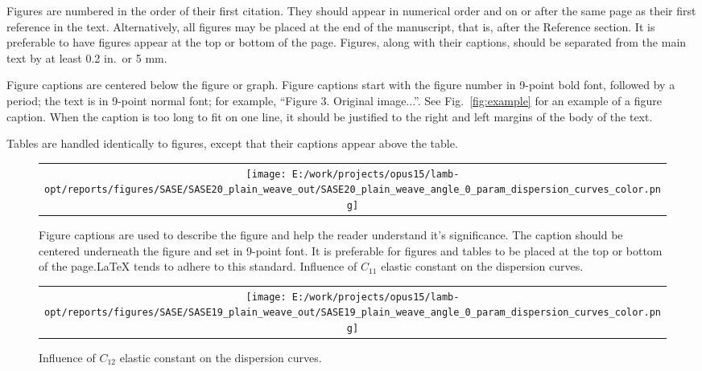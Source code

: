 \documentclass[]{spie}  %
\providecommand{\DIFaddtex}[1]{{\protect\color{red}#1}} %
\providecommand{\DIFdeltex}[1]{{\protect\color{mygrey}\scriptsize{#1}}}                       %
\providecommand{\DIFaddbegin}{} %
\providecommand{\DIFaddFL}[1]{\DIFadd{#1}} %
\providecommand{\DIFdelFL}[1]{\DIFdel{#1}} %
\providecommand{\DIFaddbeginFL}{} %
\providecommand{\DIFaddendFL}{} %
\providecommand{\DIFdelbeginFL}{} %
\providecommand{\DIFdelendFL}{} %
\providecommand{\DIFadd}[1]{\texorpdfstring{\DIFaddtex{#1}}{#1}} %
\providecommand{\DIFdel}[1]{\texorpdfstring{\DIFdeltex{#1}}{}} %
\newcommand{\DIFscaledelfig}{0.5}
\newlength{\DIFdelgraphicswidth} %
\newlength{\DIFdelgraphicsheight} %
\newcommand{\DIFaddincludegraphics}[2][]{{\color{blue}\fbox{\DIFOincludegraphics[#1]{#2}}}} %
\newcommand{\DIFdelincludegraphics}[2][]{%
\sbox{\DIFdelgraphicsbox}{\DIFOincludegraphics[#1]{#2}}%
\settoboxwidth{\DIFdelgraphicswidth}{\DIFdelgraphicsbox} %
\settoboxtotalheight{\DIFdelgraphicsheight}{\DIFdelgraphicsbox} %
\scalebox{\DIFscaledelfig}{%
\parbox[b]{\DIFdelgraphicswidth}{\usebox{\DIFdelgraphicsbox}\\[-\baselineskip] \rule{\DIFdelgraphicswidth}{0em}}\llap{\resizebox{\DIFdelgraphicswidth}{\DIFdelgraphicsheight}{%
\setlength{\unitlength}{\DIFdelgraphicswidth}%
\begin{picture}(1,1)%
\thicklines\linethickness{2pt} %
{\color[rgb]{1,0,0}\put(0,0){\framebox(1,1){}}}%
{\color[rgb]{1,0,0}\put(0,0){\line( 1,1){1}}}%
{\color[rgb]{1,0,0}\put(0,1){\line(1,-1){1}}}%
\end{picture}%
}\hspace*{3pt}}} %
} %
\DeclareRobustCommand{\DIFaddbegin}{\DIFOaddbegin \let\includegraphics\DIFaddincludegraphics} %
\DeclareRobustCommand{\DIFaddbeginFL}{\DIFOaddbeginFL \let\includegraphics\DIFaddincludegraphics} %
\DeclareRobustCommand{\DIFaddendFL}{\DIFOaddendFL \let\includegraphics\DIFOincludegraphics} %
\DeclareRobustCommand{\DIFdelbeginFL}{\DIFOdelbeginFL \let\includegraphics\DIFdelincludegraphics} %
\DeclareRobustCommand{\DIFdelendFL}{\DIFOaddendFL \let\includegraphics\DIFOincludegraphics} %
\begin{document}
Figures are numbered in the order of their first citation.  They should appear in numerical order and on or after the same page as their first reference in the text.  Alternatively, all figures may be placed at the end of the manuscript, that is, after the Reference section.  It is preferable to have figures appear at the top or bottom of the page.  Figures, along with their captions, should be separated from the main text by at least 0.2 in.\ or 5 mm.  

Figure captions are centered below the figure or graph.  Figure captions start with the figure number in 9-point bold font, followed by a period; the text is in 9-point normal font; for example, ``{\footnotesize{Figure 3.}  Original image...}''.  See Fig.~\ref{fig:example} for an example of a figure caption.  When the caption is too long to fit on one line, it should be justified to the right and left margins of the body of the text.  

Tables are handled identically to figures, except that their captions appear above the table. 

   \begin{figure} [ht]
   \begin{center}
   \begin{tabular}{c} %
   \DIFdelbeginFL %
\DIFdelendFL %
   \DIFaddbeginFL \texttt{[image: E:/work/projects/opus15/lamb-opt/reports/figures/SASE/SASE20\_plain\_weave\_out/SASE20\_plain\_weave\_angle\_0\_param\_dispersion\_curves\_color.png]}
   \DIFaddendFL \end{tabular}
   \end{center}
   \caption[example] 
   { \DIFdelbeginFL %
\DIFdelFL{Figure captions are used to describe the figure and help the reader understand it's significance.  The caption should be centered underneath the figure and set in 9-point font.  It is preferable for figures and tables to be placed at the top or bottom of the page.LaTeX tends to adhere to this standard.}\DIFdelendFL \DIFaddbeginFL \label{fig:C11} 
\DIFaddFL{Influence of $C_{11}$ elastic constant on the dispersion curves.}\DIFaddendFL }
   \end{figure} 

\begin{figure} [ht]
	\begin{center}
		\begin{tabular}{c} %
			\texttt{[image: E:/work/projects/opus15/lamb-opt/reports/figures/SASE/SASE19\_plain\_weave\_out/SASE19\_plain\_weave\_angle\_0\_param\_dispersion\_curves\_color.png]}
		\end{tabular}
	\end{center}
	\caption[example] 
	{ \label{fig:C12} 
		Influence of $C_{12}$ elastic constant on the dispersion curves.}
\end{figure} 
\DIFaddbegin 
\end{document}
